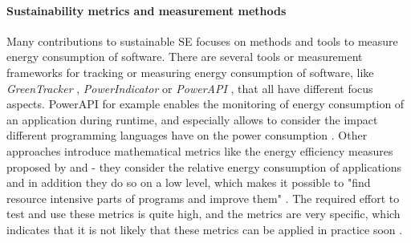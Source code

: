 \documentclass[oribibl]{llncs}
\begin{document}
\paragraph{Sustainability metrics and measurement methods} Many contributions to sustainable SE focuses on methods and tools to measure energy consumption of software. %
There are several tools or measurement frameworks for tracking or measuring energy consumption of software, like \textit{GreenTracker} \cite{amsel_toward_2011}, \textit{PowerIndicator} \cite{naumann_how_2008} or \textit{PowerAPI} \cite{noureddine_preliminary_2012}, that all have different focus aspects. PowerAPI for example enables the monitoring of energy consumption of an application during runtime, and especially allows to consider the impact different programming languages have on the power consumption \cite{noureddine_preliminary_2012}. %
Other approaches introduce mathematical metrics %
like the energy efficiency measures proposed by \cite{capra_is_2012} and \cite{johann_how_2012} - they consider the relative energy consumption of applications %
and in addition they do so on a low level, which makes it possible to "find resource intensive parts of programs and improve them" \cite{johann_how_2012}. The required effort to test and use these metrics is quite high, and the metrics are very specific, which indicates that it is not likely that these metrics can be applied in practice soon \cite{johann_how_2012}.\\
\end{document}

